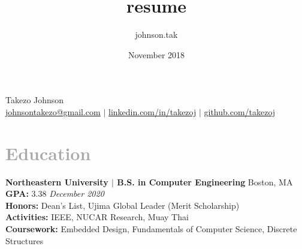 \documentclass{article}
\title{resume}
\author{johnson.tak }
\date{November 2018}
\newcommand\HUGE{\fontsize{28}{48}\selectfont}
\newcommand\LArge{\fontsize{15}{20}\selectfont}
\begin{document}
\thispagestyle{empty}

{\selectfont

\titleformat{\section}{\LArge}{}{0em}{}{}
\titleformat{\subsection}{}{}{0em}{}{}


\renewcommand{\maketitle}{
\begin{center}
{\HUGE Takezo Johnson}\\
\vspace{.5em}
\href{mailto:johnsontakezo@gmail.com}{\faSend{ }johnsontakezo@gmail.com} $\mid$ 
\href{https://www.linkedin.com/in/takezoj}{\faLinkedinSquare{ }linkedin.com/in/takezoj} $\mid$ 
\href{https://www.github.com/takezoj}{\faGithub{ }github.com/takezoj}
\end{center}}

\newenvironment{myitemize}
{ \begin{itemize}
    \setlength{\itemsep}{0pt}
    \setlength{\parskip}{0pt}
    \setlength{\parsep}{0pt}}
{ \end{itemize}} 

\maketitle

\section[Education \hfill]{\textcolor{darkgray}{Education \sout{\hfill}}}
    {\bfseries\large Northeastern University $\mid$ B.S. in Computer Engineering} \hfill Boston, MA\\
    {\bfseries GPA:} 3.38 \hfill\textit{December 2020}\\
    {\bfseries Honors:} Dean's List, Ujima Global Leader (Merit Scholarship)\\
    {\bfseries Activities:} IEEE, NUCAR Research, Muay Thai\\
    {\bfseries Coursework:} Embedded Design, Fundamentals of Computer Science, Discrete Structures%

}
\end{document}
